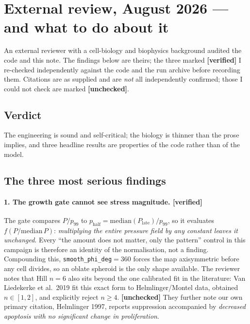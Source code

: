 \documentclass[10pt]{article}
\newcommand{\op}[1]{\texttt{#1}}
\begin{document}
\section{External review, August 2026 --- and what to do about it}

An external reviewer with a cell-biology and biophysics background audited the code and this note. The
findings below are theirs; the three marked \textbf{[verified]} I re-checked independently against the
code and the run archive before recording them. Citations are as supplied and are \emph{not} all
independently confirmed; those I could not check are marked \textbf{[unchecked]}.

\subsection*{Verdict}
The engineering is sound and self-critical; the biology is thinner than the prose implies, and three
headline results are properties of the code rather than of the model.

\subsection*{The three most serious findings}

\paragraph{1. The growth gate cannot see stress magnitude. [verified]} The gate compares
$P/p_{99}$ to $p_{\text{half}}=\mathrm{median}(P_{\text{late}})/p_{99}$, so it evaluates
$f(P/\mathrm{median}\,P)$: \emph{multiplying the entire pressure field by any constant leaves it
unchanged}. Every ``the amount does not matter, only the pattern'' control in this campaign is therefore
an identity of the normalisation, not a finding. Compounding this, \op{smooth\_phi\_deg}$=360$ forces the
map axisymmetric before any cell divides, so an oblate spheroid is the only shape available. The
reviewer notes that Hill $n=6$ also sits beyond the one calibrated fit in the literature: Van Liedekerke
et al.\ 2019 fit this exact form to Helmlinger/Montel data, obtained $n\in[1,2]$, and explicitly reject
$n\ge4$. \textbf{[unchecked]} They further note our own primary citation, Helmlinger 1997, reports
suppression accompanied by \emph{decreased apoptosis with no significant change in proliferation}.
\end{document}
